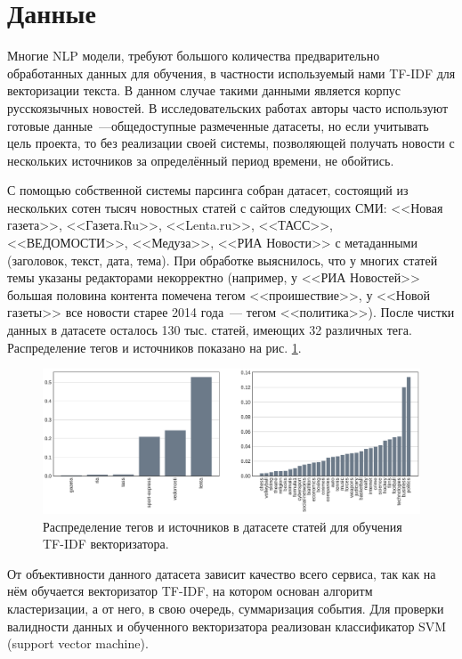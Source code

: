 \documentclass[a4paper, 14pt]{extarticle}
\begin{document}
\section{Данные}
Многие NLP модели, требуют большого количества предварительно обработанных данных для обучения, в частности используемый нами TF-IDF для векторизации текста. В данном случае такими данными является корпус русскоязычных новостей. В исследовательских работах авторы часто используют готовые данные~---общедоступные размеченные датасеты, но если учитывать цель проекта, то без реализации своей системы, позволяющей получать новости с нескольких источников за определённый период времени, не обойтись.

С помощью собственной системы парсинга собран датасет, состоящий из нескольких сотен тысяч новостных статей с сайтов следующих СМИ: <<Новая газета>>, <<Газета.Ru>>, <<Lenta.ru>>, <<ТАСС>>, <<ВЕДОМОСТИ>>, <<Медуза>>, <<РИА Новости>> с метаданными (заголовок, текст, дата, тема). При обработке выяснилось, что у многих статей темы указаны редакторами некорректно (например, у <<РИА Новостей>> большая половина контента помечена тегом <<проишествие>>, у <<Новой газеты>> все новости старее 2014 года~--- тегом <<политика>>). После чистки данных в датасете осталось 130 тыс. статей, имеющих 32 различных тега. Распределение тегов и источников показано на рис. \ref{datadistr}.

\begin{figure}[h!]
	\centering
	\includegraphics[scale=0.35]{datadistr}
	\caption{Распределение тегов и источников в датасете статей для обучения TF-IDF векторизатора.}
	\label{datadistr}
\end{figure}

От объективности данного датасета зависит качество всего сервиса, так как на нём обучается векторизатор TF-IDF, на котором основан алгоритм кластеризации, а от него, в свою очередь, суммаризация события. Для проверки валидности данных и обученного векторизатора реализован классификатор SVM (support vector machine).
\end{document}
